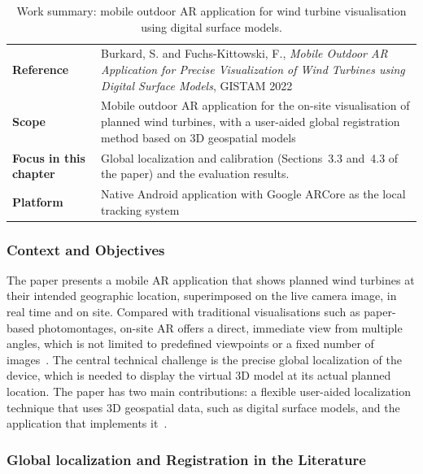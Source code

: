 \begin{table}[htbp]
\centering
\caption{Work summary: mobile outdoor AR application for wind turbine visualisation using digital surface models.}
\label{tab:ficha_burkard2022}
\small
\begin{tabular}{p{3.2cm}p{9.8cm}}
\hline
\textbf{Reference} & Burkard, S. and Fuchs-Kittowski, F., \textit{Mobile Outdoor AR Application for Precise Visualization of Wind Turbines using Digital Surface Models}, GISTAM 2022~\cite{burkard2022gistam} \\
\textbf{Scope} & Mobile outdoor AR application for the on-site visualisation of planned wind turbines, with a user-aided global registration method based on 3D geospatial models \\
\textbf{Focus in this chapter} & Global localization and calibration (Sections~3.3 and~4.3 of the paper) and the evaluation results. \\
\textbf{Platform} & Native Android application with Google ARCore as the local tracking system \\
\hline
\end{tabular}
\end{table}

\subsubsection{Context and Objectives}

The paper presents a mobile AR application that shows planned wind turbines at their intended geographic location, superimposed on the live camera image, in real time and on site. Compared with traditional visualisations such as paper-based photomontages, on-site AR offers a direct, immediate view from multiple angles, which is not limited to predefined viewpoints or a fixed number of images~\cite{burkard2022gistam}. The central technical challenge is the precise global localization of the device, which is needed to display the virtual 3D model at its actual planned location. The paper has two main contributions: a flexible user-aided localization technique that uses 3D geospatial data, such as digital surface models, and the application that implements it~\cite{burkard2022gistam}.

\subsubsection{Global localization and Registration in the Literature}
\label{sec:burkard2022_sota}

